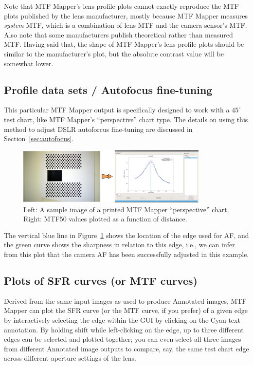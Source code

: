 \documentclass[a4paper]{article}
\begin{document}
Note that MTF Mapper's lens profile plots cannot exactly reproduce the MTF
plots published by the lens manufacturer, mostly because MTF Mapper measures
\emph{system} MTF, which is a combination of lens MTF and the camera
sensor's MTF.  Also note that some manufacturers publish theoretical rather
than measured MTF.  Having said that, the shape of MTF Mapper's lens profile
plots should be similar to the manufacturer's plot, but the absolute
contrast value will be somewhat lower.

\subsection{Profile data sets / Autofocus fine-tuning} 
This particular MTF Mapper output is specifically designed to work with a
$45^\circ$ test chart, like MTF Mapper's ``perspective'' chart type. The
details on using this method to adjust DSLR autoforcus fine-tuning are
discussed in Section~\ref{sec:autofocus}.

\begin{figure}[!ht]
\centering
\includegraphics[width=0.85\textwidth]{figures/profile_example}
\caption{Left: A sample image of a printed MTF Mapper ``perspective'' chart.
Right: MTF50 values plotted as a function of distance.}
\label{fig:profile_example}
\end{figure}

The vertical blue line in Figure~\ref{fig:profile_example} shows the
location of the edge used for AF, and the green curve shows the sharpness in
relation to this edge, i.e., we can infer from this plot that the camera AF
has been successfully adjusted in this example.

\subsection{Plots of SFR curves (or MTF curves)}
\label{sec:sfr_curve}
Derived from the same input images as used to produce \textsf{Annotated
images}, MTF Mapper can plot the SFR curve (or the MTF curve, if you prefer)
of a given edge by interactively selecting the edge within the GUI by
clicking on the Cyan text annotation. By holding shift while left-clicking
on the edge, up to three different edges can be selected and plotted
together; you can even select all three images from different
\textsf{Annotated image} outputs to compare, say, the same test chart edge
across different aperture settings of the lens.
\end{document}
